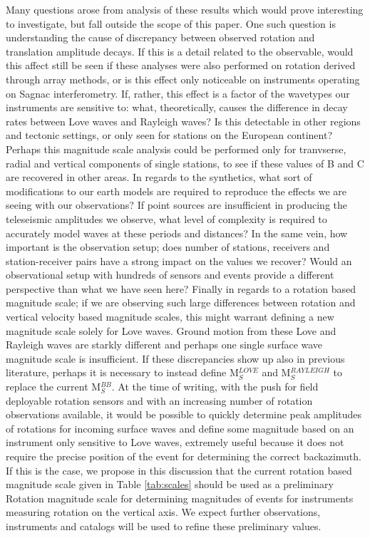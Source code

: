 \documentclass{gji}
\begin{document}
Many questions arose from analysis of these results which would prove interesting to investigate, but fall outside the scope of this paper. One such question is understanding the cause of discrepancy between observed rotation and translation amplitude decays. If this is a detail related to the observable, would this affect still be seen if these analyses were also performed on rotation derived through array methods, or is this effect only noticeable on instruments operating on Sagnac interferometry. If, rather, this effect is a factor of the wavetypes our instruments are sensitive to: what, theoretically, causes the difference in decay rates between Love waves and Rayleigh waves? Is this detectable in other regions and tectonic settings, or only seen for stations on the European continent? Perhaps this magnitude scale analysis could be performed only for tranvserse, radial and vertical components of single stations, to see if these values of B and C are recovered in other areas. In regards to the synthetics, what sort of modifications to our earth models are required to reproduce the effects we are seeing with our observations? If point sources are insufficient in producing the teleseismic amplitudes we observe, what level of complexity is required to accurately model waves at these periods and distances? In the same vein, how important is the observation setup; does number of stations, receivers and station-receiver pairs have a strong impact on the values we recover? Would an observational setup with hundreds of sensors and events provide a different perspective than what we have seen here? Finally in regards to a rotation based magnitude scale; if we are observing such large differences between rotation and vertical velocity based magnitude scales, this might warrant defining a new magnitude scale solely for Love waves. Ground motion from these Love and Rayleigh waves are starkly different and perhaps one single surface wave magnitude scale is insufficient. If these discrepancies show up also in previous literature, perhaps it is necessary to instead define M$_S^{LOVE}$ and M$_S^{RAYLEIGH}$ to replace the current M$_S^{BB}$. At the time of writing, with the push for field deployable rotation sensors and with an increasing number of rotation observations available, it would be possible to quickly determine peak amplitudes of rotations for incoming surface waves and define some magnitude based on an instrument only sensitive to Love waves, extremely useful because it does not require the precise position of the event for determining the correct backazimuth. If this is the case, we propose in this discussion that the current rotation based magnitude scale given in Table \ref{tab:scales} should be used as a preliminary Rotation magnitude scale for determining magnitudes of events for instruments measuring rotation on the vertical axis. We expect further observations, instruments and catalogs will be used to refine these preliminary values.
\end{document}
